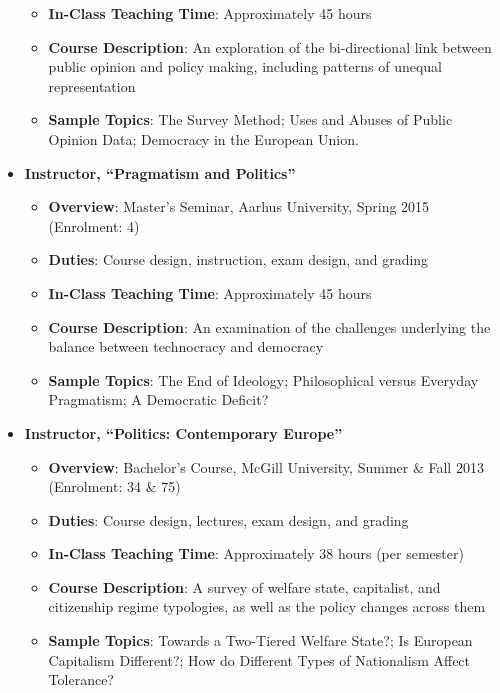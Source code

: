 \documentclass[11pt]{article}
\begin{document}
\begin{itemize}[noitemsep]
\begin{itemize}[noitemsep]
    	    \item \textbf{In-Class Teaching Time}: Approximately 45 hours
			\item \textbf{Course Description}: An exploration of the bi-directional link between public opinion and policy making, including patterns of unequal representation
			\item \textbf{Sample Topics}: The Survey Method; Uses and Abuses of Public Opinion Data; Democracy in the European Union.
		\end{itemize}
		\item \textbf{Instructor, “Pragmatism and Politics”}\\[-4ex]
		\begin{itemize}[noitemsep]
			\item \textbf{Overview}: Master’s Seminar, Aarhus University, Spring 2015 (Enrolment: 4)
			\item \textbf{Duties}: Course design, instruction, exam design, and grading
        	\item \textbf{In-Class Teaching Time}: Approximately 45 hours
			\item \textbf{Course Description}: An examination of the challenges underlying the balance between technocracy and democracy
			\item \textbf{Sample Topics}: The End of Ideology; Philosophical versus Everyday Pragmatism; A Democratic Deficit?
		\end{itemize}
		\item \textbf{Instructor, “Politics: Contemporary Europe”}\\[-4ex]
		\begin{itemize}[noitemsep]
			\item \textbf{Overview}: Bachelor’s Course, McGill University, Summer \& Fall 2013 (Enrolment: 34 \& 75)
			\item \textbf{Duties}: Course design, lectures, exam design, and grading
        	\item \textbf{In-Class Teaching Time}: Approximately 38 hours (per semester)
			\item \textbf{Course Description}: A survey of welfare state, capitalist, and citizenship regime typologies, as well as the policy changes across them
			\item \textbf{Sample Topics}: Towards a Two-Tiered Welfare State?; Is European Capitalism Different?; How do Different Types of Nationalism Affect Tolerance? \\[-5ex]
		\end{itemize}
	\end{itemize} 
\end{document}
